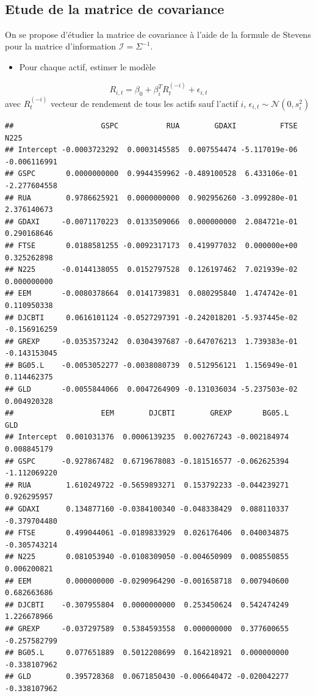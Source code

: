 \documentclass[
]{article}
\providecommand{\tightlist}{%
  \setlength{\itemsep}{0pt}\setlength{\parskip}{0pt}}
\begin{document}
~

\hypertarget{etude-de-la-matrice-de-covariance}{%
\subsection{Etude de la matrice de
covariance}\label{etude-de-la-matrice-de-covariance}}

On se propose d'étudier la matrice de covariance à l'aide de la formule
de Stevens pour la matrice d'information \(\mathcal{I} = \Sigma^{-1}\).

\begin{itemize}
\tightlist
\item
  Pour chaque actif, estimer le modèle
\end{itemize}

\[
R_{i,t} = \beta_0 + \beta_i^T R_t^{(-i)} + \epsilon_{i,t}
\] avec \(R_t^{(-i)}\) vecteur de rendement de tous les actifs sauf
l'actif \(i\), \(\epsilon_{i,t} \sim \mathcal{N}(0, s_i^2)\)

\begin{verbatim}
##                    GSPC           RUA        GDAXI          FTSE         N225
## Intercept -0.0003723292  0.0003145585  0.007554474 -5.117019e-06 -0.006116991
## GSPC       0.0000000000  0.9944359962 -0.489100528  6.433106e-01 -2.277604558
## RUA        0.9786625921  0.0000000000  0.902956260 -3.099280e-01  2.376140673
## GDAXI     -0.0071170223  0.0133509066  0.000000000  2.084721e-01  0.290168646
## FTSE       0.0188581255 -0.0092317173  0.419977032  0.000000e+00  0.325262898
## N225      -0.0144138055  0.0152797528  0.126197462  7.021939e-02  0.000000000
## EEM       -0.0080378664  0.0141739831  0.080295840  1.474742e-01  0.110950338
## DJCBTI     0.0616101124 -0.0527297391 -0.242018201 -5.937445e-02 -0.156916259
## GREXP     -0.0353573242  0.0304397687 -0.647076213  1.739383e-01 -0.143153045
## BG05.L    -0.0053052277 -0.0038080739  0.512956121  1.156949e-01  0.114462375
## GLD       -0.0055844066  0.0047264909 -0.131036034 -5.237503e-02  0.004920328
##                    EEM        DJCBTI        GREXP       BG05.L          GLD
## Intercept  0.001031376  0.0006139235  0.002767243 -0.002184974  0.008845179
## GSPC      -0.927867482  0.6719678083 -0.181516577 -0.062625394 -1.112069220
## RUA        1.610249722 -0.5659893271  0.153792233 -0.044239271  0.926295957
## GDAXI      0.134877160 -0.0384100340 -0.048338429  0.088110337 -0.379704480
## FTSE       0.499044061 -0.0189833929  0.026176406  0.040034875 -0.305743214
## N225       0.081053940 -0.0108309050 -0.004650909  0.008550855  0.006200821
## EEM        0.000000000 -0.0290964290 -0.001658718  0.007940600  0.682663686
## DJCBTI    -0.307955804  0.0000000000  0.253450624  0.542474249  1.226678966
## GREXP     -0.037297589  0.5384593558  0.000000000  0.377600655 -0.257582799
## BG05.L     0.077651889  0.5012208699  0.164218921  0.000000000 -0.338107962
## GLD        0.395728368  0.0671850430 -0.006640472 -0.020042277 -0.338107962
\end{verbatim}
\end{document}
